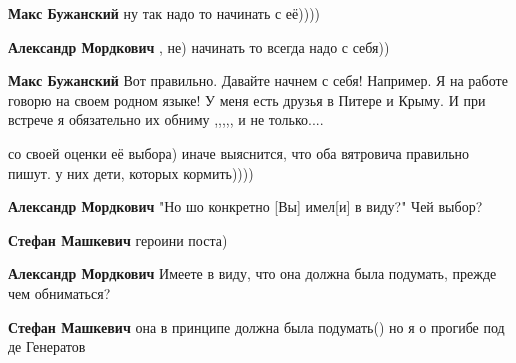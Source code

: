 \begin{itemize}
\begin{itemize}
\textbf{Макс Бужанский} ну так надо то начинать с её))))

 
\textbf{Александр Мордкович} , не) начинать то всегда надо с себя))

 
\textbf{Макс Бужанский} Вот правильно. Давайте начнем с себя! Например. Я на
работе говорю на своем родном языке! У меня есть друзья в Питере и Крыму. И при
встрече я обязательно их обниму ,,,,, и не только....

 
со своей оценки её выбора)
иначе выяснится, что оба вятровича правильно пишут. у них дети, которых кормить))))


\textbf{Александр Мордкович} "Но шо конкретно [Вы] имел[и] в виду?"
Чей выбор?

 
\textbf{Стефан Машкевич} героини поста)


\textbf{Александр Мордкович} Имеете в виду, что она должна была подумать, прежде чем обниматься?

 
\textbf{Стефан Машкевич} она в принципе должна была подумать() но я о прогибе под де Генератов

 

\end{itemize}
\end{itemize}
